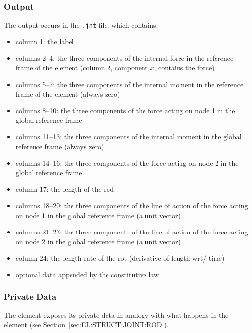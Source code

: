 \subsubsection{Output}
The output occurs in the \texttt{.jnt} file, which contains:
\begin{itemize}
\item column 1: the label

\item columns 2--4: the three components of the internal force in the 
	reference frame of the element (column 2, component $x$, 
	contains the force)

\item columns 5--7: the three components of the internal moment in the 
	reference frame of the element (always zero)

\item columns 8--10: the three components of the force acting on node 1 
	in the global reference frame

\item columns 11--13: the three components of the internal moment in 
	the global reference frame (always zero)

\item columns 14--16: the three components of the force acting on node 2 
	in the global reference frame

\item column 17: the length of the rod

\item columns 18--20: the three components of the line of action of the force 
acting on node 1 in the global reference frame (a unit vector)

\item columns 21--23: the three components of the line of action of the force 
acting on node 2 in the global reference frame (a unit vector)

\item column 24: the length rate of the rot (derivative of length wrt/ time)

\item optional data appended by the constitutive law
\end{itemize}

\subsubsection{Private Data}
The element exposes its private data in analogy with what happens in 
the  element (see Section~\ref{sec:EL:STRUCT:JOINT:ROD}).

